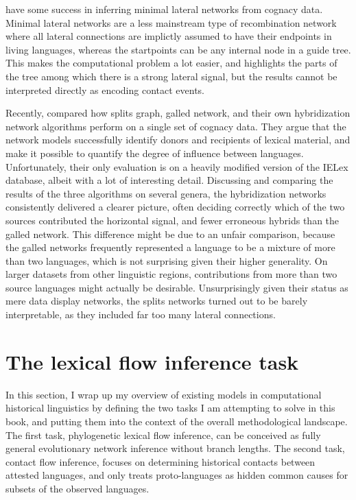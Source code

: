 \citet{list_ea_2014} have some success in inferring minimal lateral networks from cognacy data. Minimal lateral networks are a less mainstream type of recombination network where all lateral connections are implictly assumed to have their endpoints in living languages, whereas the startpoints can be any internal node in a guide tree. This makes the computational problem a lot easier, and highlights the parts of the tree among which there is a strong lateral signal, but the results cannot be interpreted directly as encoding contact events.

Recently, \citet{willems_ea_2016} compared how splits graph, galled network, and their own hybridization network algorithms perform on a single set of cognacy data. They argue that the network models successfully identify donors and recipients of lexical material, and make it possible to quantify the degree of influence between languages. Unfortunately, their only evaluation is on a heavily modified version of the IELex database, albeit with a lot of interesting detail. Discussing and comparing the results of the three algorithms on several genera, the hybridization networks consistently delivered a clearer picture, often deciding correctly which of the two sources contributed the horizontal signal, and fewer erroneous hybrids than the galled network. This difference might be due to an unfair comparison, because the galled networks frequently represented a language to be a mixture of more than two languages, which is not surprising given their higher generality. On larger datasets from other linguistic regions, contributions from more than two source languages might actually be desirable. Unsurprisingly given their status as mere data display networks, the splits networks turned out to be barely interpretable, as they included far too many lateral connections. 

\section{The lexical flow inference task}\label{sec:2:6}
In this section, I wrap up my overview of existing models in computational historical linguistics by defining the two tasks I am attempting to solve in this book, and putting them into the context of the overall methodological landscape. The first task, phylogenetic lexical flow inference, can be conceived as fully general evolutionary network inference without branch lengths. The second task, contact flow inference, focuses on determining historical contacts between attested languages, and only treats proto-languages as hidden common causes for subsets of the observed languages.

